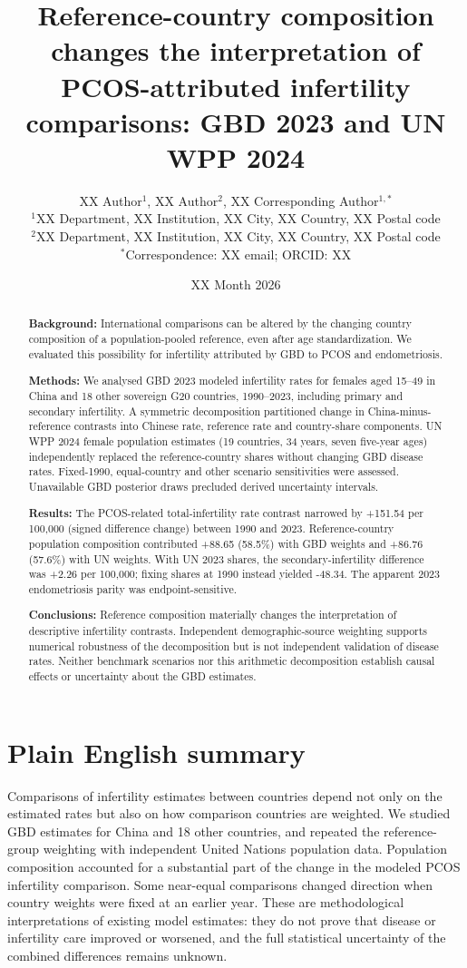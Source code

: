 \documentclass[11pt,a4paper]{article}
\title{Reference-country composition changes the interpretation of PCOS-attributed infertility comparisons: GBD 2023 and UN WPP 2024}
\author{XX Author$^{1}$, XX Author$^{2}$, XX Corresponding Author$^{1,*}$\\
{\small $^{1}$XX Department, XX Institution, XX City, XX Country, XX Postal code}\\
{\small $^{2}$XX Department, XX Institution, XX City, XX Country, XX Postal code}\\
{\small $^{*}$Correspondence: XX email; ORCID: XX}}
\date{XX Month 2026}
\begin{document}
\maketitle
\linenumbers
\begin{abstract}
\noindent\textbf{Background:} International comparisons can be altered by the changing country composition of a population-pooled reference, even after age standardization. We evaluated this possibility for infertility attributed by GBD to PCOS and endometriosis.

\noindent\textbf{Methods:} We analysed GBD 2023 modeled infertility rates for females aged 15--49 in China and 18 other sovereign G20 countries, 1990--2023, including primary and secondary infertility. A symmetric decomposition partitioned change in China-minus-reference contrasts into Chinese rate, reference rate and country-share components. UN WPP 2024 female population estimates (19 countries, 34 years, seven five-year ages) independently replaced the reference-country shares without changing GBD disease rates. Fixed-1990, equal-country and other scenario sensitivities were assessed. Unavailable GBD posterior draws precluded derived uncertainty intervals.

\noindent\textbf{Results:} The PCOS-related total-infertility rate contrast narrowed by +151.54 per 100,000 (signed difference change) between 1990 and 2023. Reference-country population composition contributed +88.65 (58.5\%) with GBD weights and +86.76 (57.6\%) with UN weights. With UN 2023 shares, the secondary-infertility difference was +2.26 per 100,000; fixing shares at 1990 instead yielded -48.34. The apparent 2023 endometriosis parity was endpoint-sensitive.

\noindent\textbf{Conclusions:} Reference composition materially changes the interpretation of descriptive infertility contrasts. Independent demographic-source weighting supports numerical robustness of the decomposition but is not independent validation of disease rates. Neither benchmark scenarios nor this arithmetic decomposition establish causal effects or uncertainty about the GBD estimates.
\end{abstract}

\section*{Plain English summary}
Comparisons of infertility estimates between countries depend not only on the estimated rates but also on how comparison countries are weighted. We studied GBD estimates for China and 18 other countries, and repeated the reference-group weighting with independent United Nations population data. Population composition accounted for a substantial part of the change in the modeled PCOS infertility comparison. Some near-equal comparisons changed direction when country weights were fixed at an earlier year. These are methodological interpretations of existing model estimates: they do not prove that disease or infertility care improved or worsened, and the full statistical uncertainty of the combined differences remains unknown.
\end{document}
